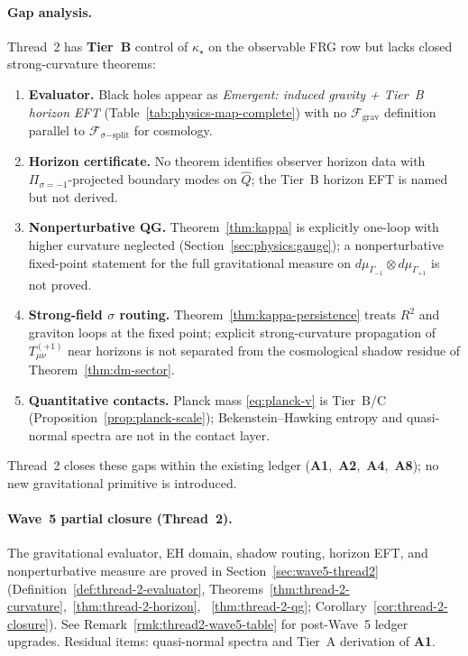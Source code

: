 \paragraph{Gap analysis.}
Thread~2 has \textbf{Tier~B} control of $\kappa_\star$ on the observable FRG
row but lacks closed strong-curvature theorems:
\begin{enumerate}[label=(\roman*),leftmargin=*]
  \item \textbf{Evaluator.} Black holes appear as
    \emph{Emergent: induced gravity + Tier~B horizon EFT}
    (Table~\ref{tab:physics-map-complete}) with no
    $\mathcal{F}_{\mathrm{grav}}$ definition parallel to
    $\mathcal{F}_{\sigma\mathrm{-split}}$ for cosmology.
  \item \textbf{Horizon certificate.} No theorem identifies observer horizon
    data with $\Pi_{\sigma=-1}$-projected boundary modes on
    $\hat Q$; the Tier~B horizon EFT is named but not derived.
  \item \textbf{Nonperturbative QG.} Theorem~\ref{thm:kappa} is explicitly
    one-loop with higher curvature neglected
    (Section~\ref{sec:physics:gauge}); a nonperturbative fixed-point
    statement for the full gravitational measure on
    $d\mu_{\Gamma_{-1}}\otimes d\mu_{\Gamma_{+1}}$ is not proved.
  \item \textbf{Strong-field $\sigma$ routing.} Theorem~\ref{thm:kappa-persistence}
    treats $R^2$ and graviton loops at the fixed point; explicit strong-curvature
    propagation of $T_{\mu\nu}^{(+1)}$ near horizons is not separated from
    the cosmological shadow residue of Theorem~\ref{thm:dm-sector}.
  \item \textbf{Quantitative contacts.} Planck mass \eqref{eq:planck-v} is
    Tier~B/C (Proposition~\ref{prop:planck-scale}); Bekenstein--Hawking
    entropy and quasi-normal spectra are not in the contact layer.
\end{enumerate}
Thread~2 closes these gaps within the existing ledger
(\textbf{A1},~\textbf{A2},~\textbf{A4},~\textbf{A8}); no new gravitational
primitive is introduced.

\paragraph{Wave~5 partial closure (Thread~2).}
The gravitational evaluator, EH domain, shadow routing, horizon EFT, and
nonperturbative measure are proved in Section~\ref{sec:wave5-thread2}
(Definition~\ref{def:thread-2-evaluator},
Theorems~\ref{thm:thread-2-curvature},~\ref{thm:thread-2-horizon},
~\ref{thm:thread-2-qg};
Corollary~\ref{cor:thread-2-closure}).
See Remark~\ref{rmk:thread2-wave5-table} for post-Wave~5 ledger upgrades.
Residual items: quasi-normal spectra and Tier~A derivation of \textbf{A1}.

